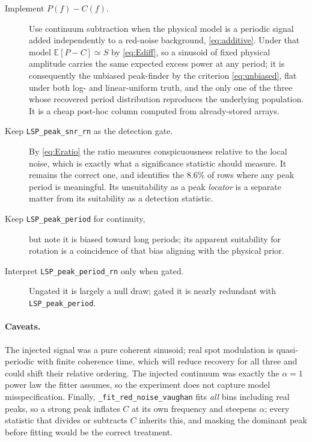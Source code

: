 \documentclass[11pt]{article}
\newcommand{\Praw}{\texttt{LSP\_peak\_period}}
\newcommand{\Prn}{\texttt{LSP\_peak\_period\_rn}}
\newcommand{\Srn}{\texttt{LSP\_peak\_snr\_rn}}
\begin{document}
\begin{description}
  \item[Implement $P(f)-C(f)$.] Use continuum subtraction when the physical model is a
        periodic signal added independently to a red-noise background, \eqref{eq:additive}.
        Under that model $\mathbb{E}[P-C]\simeq S$ by \eqref{eq:Ediff}, so a sinusoid of
        fixed physical amplitude carries the same expected excess power at any period; it
        is consequently the unbiased peak-finder by the criterion \eqref{eq:unbiased},
        flat under both log- and linear-uniform truth, and the only one of the three whose
        recovered period distribution reproduces the underlying population. It is a cheap
        post-hoc column computed from already-stored arrays.
  \item[Keep \Srn{} as the detection gate.] By \eqref{eq:Eratio} the ratio measures
        conspicuousness relative to the local noise, which is exactly what a significance
        statistic should measure. It remains the correct one, and identifies the $8.6\%$
        of rows where any peak period is meaningful. Its unsuitability as a peak
        \emph{locator} is a separate matter from its suitability as a detection statistic.
  \item[Keep \Praw{} for continuity,] but note it is biased toward long periods; its
        apparent suitability for rotation is a coincidence of that bias aligning with the
        physical prior.
  \item[Interpret \Prn{} only when gated.] Ungated it is largely a null draw; gated it is
        nearly redundant with \Praw{}.
\end{description}

\paragraph{Caveats.}
The injected signal was a pure coherent sinusoid; real spot modulation is quasi-periodic
with finite coherence time, which will reduce recovery for all three and could shift their
relative ordering. The injected continuum was exactly the $\alpha=1$ power law the fitter
assumes, so the experiment does not capture model misspecification. Finally,
\texttt{\_fit\_red\_noise\_vaughan} fits \emph{all} bins including real peaks, so a strong
peak inflates $C$ at its own frequency and steepens $\alpha$; every statistic that divides
or subtracts $C$ inherits this, and masking the dominant peak before fitting would be the
correct treatment.
\end{document}
